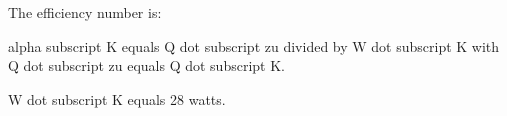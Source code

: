The efficiency number is:

alpha subscript K equals Q dot subscript zu divided by W dot subscript K with Q dot subscript zu equals Q dot subscript K.

W dot subscript K equals 28 watts.